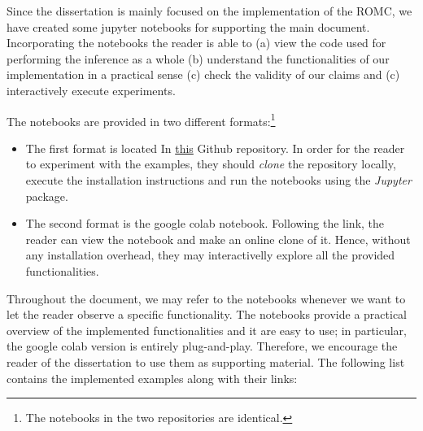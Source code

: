 Since the dissertation is mainly focused on the implementation of the
ROMC, we have created some jupyter notebooks for supporting the main
document. Incorporating the notebooks the reader is able to (a) view
the code used for performing the inference as a whole (b) understand
the functionalities of our implementation in a practical sense (c)
check the validity of our claims and (c) interactively execute
experiments.

The notebooks are provided in two different formats:\footnote{The
  notebooks in the two repositories are identical.}

\begin{itemize}
\item The first format is located In
  \href{https://github.com/givasile/edinburgh-thesis/tree/master/notebook_examples}{this}
  Github repository. In order for the reader to experiment with the
  examples, they should \textit{clone} the repository locally, execute
  the installation instructions and run the notebooks using the
  \textit{Jupyter} package.
\item The second format is the google colab notebook. Following the
  link, the reader can view the notebook and make an online clone of
  it. Hence, without any installation overhead, they may
  interactivelly explore all the provided functionalities.
\end{itemize}


Throughout the document, we may refer to the notebooks whenever we
want to let the reader observe a specific functionality. The notebooks
provide a practical overview of the implemented functionalities and it
are easy to use; in particular, the google colab version is entirely
plug-and-play. Therefore, we encourage the reader of the dissertation
to use them as supporting material.  The following list contains the
implemented examples along with their links:

